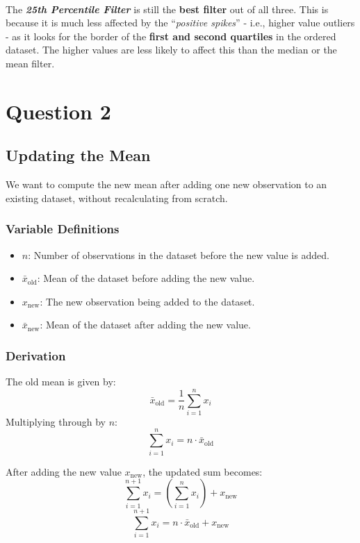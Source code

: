 \documentclass{report}
\begin{document}
\paragraph{} The \textbf{\textit{25th Percentile Filter}} is still the \textbf{best filter} out of all three. This is because it is much less affected by the “\textit{positive spikes}” - i.e., higher value outliers - as it looks for the border of the \textbf{first and second quartiles} in the ordered dataset. The higher values are less likely to affect this than the median or the mean filter.



\section*{Question 2}
\subsection{Updating the Mean}

We want to compute the new mean after adding one new observation to an existing dataset, without recalculating from scratch.

\subsubsection*{Variable Definitions}
\begin{itemize}
    \item $n$: Number of observations in the dataset before the new value is added.
    \item $\bar{x}_{\text{old}}$: Mean of the dataset before adding the new value.
    \item $x_{\text{new}}$: The new observation being added to the dataset.
    \item $\bar{x}_{\text{new}}$: Mean of the dataset after adding the new value.
\end{itemize}

\subsubsection*{Derivation}
The old mean is given by:
\[
\bar{x}_{\text{old}} = \frac{1}{n} \sum_{i=1}^{n} x_i
\]
Multiplying through by $n$:
\[
\sum_{i=1}^{n} x_i = n \cdot \bar{x}_{\text{old}}
\]

After adding the new value $x_{\text{new}}$, the updated sum becomes:
\[
\sum_{i=1}^{n+1} x_i = \left( \sum_{i=1}^{n} x_i \right) + x_{\text{new}}
\]
\[
\sum_{i=1}^{n+1} x_i = n \cdot \bar{x}_{\text{old}} + x_{\text{new}}
\]
\end{document}
